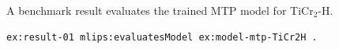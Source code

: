 A benchmark result evaluates the trained MTP model for TiCr$_2$-H.
\begin{lstlisting}[language=turtle]
ex:result-01 mlips:evaluatesModel ex:model-mtp-TiCr2H .
\end{lstlisting}
